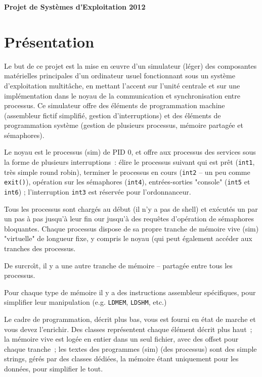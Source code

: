\documentclass{article}
\begin{document}
\begin{center}
\Large\textbf{
Projet de Syst\`emes d'Exploitation 2012}
\end{center}

\section{Pr\'esentation}

Le but de ce projet est la mise en \oe uvre d'un simulateur (l\'eger) des
composantes mat\'erielles principales d'un ordinateur usuel fonctionnant sous
un syst\`eme d'exploitation multit\^ache, en mettant l'accent sur l'unit\'e
centrale et sur une impl\'ementation dans le noyau de la communication et
synchronisation entre processus.
Ce simulateur offre des \'el\'ements de programmation
machine (assembleur fictif simplifi\'e, gestion d'interruptions) et des 
\'el\'ements de programmation syst\`eme (gestion de plusieurs processus,
m\'emoire partag\'ee et s\'emaphores).

Le noyau est le processus (sim) de PID 0, et offre aux processus des services
sous la forme de plusieurs interruptions~: \'elire le processus suivant qui est
pr\^et (\texttt{int1}, tr\`es simple round robin), terminer le processus en cours
(\texttt{int2} -- un peu comme \texttt{exit()}), op\'eration sur les
s\'emaphores (\texttt{int4}), entr\'ees-sorties "console" (\texttt{int5} et
\texttt{int6}) ; l'interruption \texttt{int3} est r\'eserv\'ee pour
l'ordonnanceur.

Tous les processus sont charg\'es au d\'ebut (il n'y a pas de shell) et
ex\'ecut\'es un par un pas \`a pas jusqu'\`a leur fin our jusqu'\`a des
requ\^etes d'op\'eration de s\'emaphores bloquantes. Chaque
processus dispose de sa propre tranche de m\'emoire vive (sim) "virtuelle"
de longueur fixe, y compris le noyau (qui peut \'egalement acc\'eder aux
tranches des processus.

De surcro\^\i t, il y a une autre tranche de m\'emoire -- partag\'ee entre
tous les processus.

Pour chaque type de m\'emoire il y a des instructions assembleur
sp\'ecifiques, pour simplifier leur manipulation (e.g. \texttt{LDMEM},
\texttt{LDSHM}, etc.) 

Le cadre de programmation, d\'ecrit plus bas, vous est fourni en \'etat de marche
et vous devez l'enrichir. Des classes repr\'esentent chaque \'el\'ement
d\'ecrit plus haut~; la m\'emoire vive est log\'ee en entier dans un seul
fichier, avec des offset pour chaque tranche~; les textes des programmes (sim)
(des processus) sont des simple strings, g\'er\'es par des classes
d\'edi\'ees, la m\'emoire \'etant uniquement pour les donn\'ees, pour
simplifier le tout.  
\end{document}
